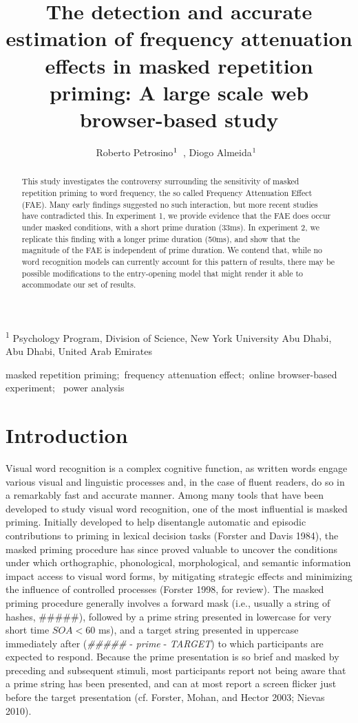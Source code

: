 \documentclass[
]{interact}
\title{The detection and accurate estimation of frequency attenuation
effects in masked repetition priming: A large scale web browser-based
study}
\author{Roberto
Petrosino$\textsuperscript{1}$~\orcidlink{0000-0002-8502-3070}, Diogo
Almeida$\textsuperscript{1}$~\orcidlink{0000-0003-4674-8092}}
\begin{document}
\captionsetup{labelsep=space}
\maketitle
\textsuperscript{1} Psychology Program, Division of Science, New York
University Abu Dhabi, Abu Dhabi, United Arab Emirates
\begin{abstract}
This study investigates the controversy surrounding the sensitivity of
masked repetition priming to word frequency, the so called Frequency
Attenuation Effect (FAE). Many early findings suggested no such
interaction, but more recent studies have contradicted this. In
experiment 1, we provide evidence that the FAE does occur under masked
conditions, with a short prime duration (33ms). In experiment 2, we
replicate this finding with a longer prime duration (50ms), and show
that the magnitude of the FAE is independent of prime duration. We
contend that, while no word recognition models can currently account for
this pattern of results, there may be possible modifications to the
entry-opening model that might render it able to accommodate our set of
results.
\end{abstract}
\begin{keywords}
\def\sep{;\ }
masked repetition priming\sep frequency attenuation effect\sep online
browser-based experiment\sep 
power analysis
\end{keywords}


\section{Introduction}\label{sec-intro}

Visual word recognition is a complex cognitive function, as written
words engage various visual and linguistic processes and, in the case of
fluent readers, do so in a remarkably fast and accurate manner. Among
many tools that have been developed to study visual word recognition,
one of the most influential is masked priming. Initially developed to
help disentangle automatic and episodic contributions to priming in
lexical decision tasks (Forster and Davis 1984), the masked priming
procedure has since proved valuable to uncover the conditions under
which orthographic, phonological, morphological, and semantic
information impact access to visual word forms, by mitigating strategic
effects and minimizing the influence of controlled processes (Forster
1998, for review). The masked priming procedure generally involves a
forward mask (i.e., usually a string of hashes, \#\#\#\#\#), followed by
a prime string presented in lowercase for very short time \(SOA < 60\)
ms), and a target string presented in uppercase immediately after
(\emph{\#\#\#\#\#} - \emph{prime} - \emph{TARGET}) to which participants
are expected to respond. Because the prime presentation is so brief and
masked by preceding and subsequent stimuli, most participants report not
being aware that a prime string has been presented, and can at most
report a screen flicker just before the target presentation (cf.
Forster, Mohan, and Hector 2003; Nievas 2010).
\end{document}
